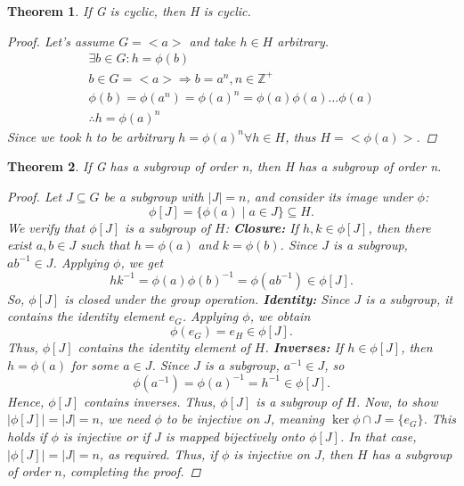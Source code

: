 \documentclass[12pt]{article}
\newtheorem{theorem}{Theorem}
\begin{document}
\begin{theorem} 
    If G is cyclic, then H is cyclic. 

    \begin{proof} 
        Let's assume \(G = <a>\) and take \(h \in H\) arbitrary. 
        \begin{gather*}
            \exists b \in G : h = \phi(b)\\ 
            b \in G = <a> \Rightarrow b = a^n, n \in \mathbb Z^+ \\ 
            \phi(b) = \phi(a^n) = \phi(a)^n = \phi(a)\phi(a)\dots \phi(a) \\ 
            \therefore h = \phi(a)^n 
        \end{gather*}
        Since we took h to be arbitrary \(h = \phi(a)^n \forall h \in H\), 
        thus \(H = <\phi(a)>\). 
        
    \end{proof}
    
\end{theorem}

\begin{theorem}
    If G has a subgroup of order n, then H has a subgroup of order n.

    \begin{proof}
        Let \( J \subseteq G \) be a subgroup with \( |J| = n \), 
        and consider its image under \( \phi \):
        \[
            \phi[J] = \{ \phi(a) \mid a \in J \} \subseteq H.
        \]
        We verify that \( \phi[J] \) is a subgroup of \( H \):
        \textbf{Closure:}  
        If \( h, k \in \phi[J] \), then there exist \( a, b \in J \) 
        such that \( h = \phi(a) \) and \( k = \phi(b) \). 
        Since \( J \) is a subgroup, \( ab^{-1} \in J \). Applying \( \phi \), we get
        \[
            hk^{-1} = \phi(a) \phi(b)^{-1} = \phi(ab^{-1}) \in \phi[J].
        \]
        So, \( \phi[J] \) is closed under the group operation.
        \textbf{Identity:}  
        Since \( J \) is a subgroup, it contains the 
        identity element \( e_G \). Applying \( \phi \), we obtain
        \[
            \phi(e_G) = e_H \in \phi[J].
        \]
        Thus, \( \phi[J] \) contains the identity element of \( H \).
        \textbf{Inverses:}  
        If \( h \in \phi[J] \), then \( h = \phi(a) \) for 
        some \( a \in J \). Since \( J \) is a subgroup, \( a^{-1} \in J \), so
        \[
            \phi(a^{-1}) = \phi(a)^{-1} = h^{-1} \in \phi[J].
        \]
        Hence, \( \phi[J] \) contains inverses.
        Thus, \( \phi[J] \) is a subgroup of \( H \).  
        Now, to show \( |\phi[J]| = |J| = n \), we need \( \phi \) 
        to be injective on \( J \), meaning \( \ker \phi \cap J = \{ e_G \} \). 
        This holds if \( \phi \) is injective or if \( J \) 
        is mapped bijectively onto \( \phi[J] \). 
        In that case, \( |\phi[J]| = |J| = n \), as required.  
        Thus, if \( \phi \) is injective on \( J \), then \( H \) has a 
        subgroup of order \( n \), completing the proof. 
    \end{proof}
\end{theorem}
\end{document}
